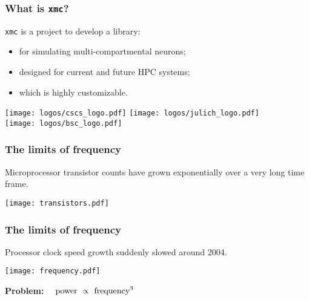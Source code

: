 \documentclass[aspectratio=43,12pt]{beamer}
\author{Sam Yates, CSCS}
\title{\xmc}
\subtitle{\xmc: modelling spiking multi-compartment networks at exascale}
\date{14 June 2017}
\newcommand{\xmc}{\texttt{xmc}\xspace}
\begin{document}
\cscstitle


\begin{frame}
\frametitle{What is \xmc?}
\vfill
\xmc{} is a project to develop a library:

\vfill
\begin{itemize}
\item for simulating multi-compartmental neurons;
\item designed for current and future HPC systems;
\item which is highly customizable.
\end{itemize}
\vfill

\centering 
\vspace{4ex}
\texttt{[image: logos/cscs\_logo.pdf]}
\hspace{15mm}
\texttt{[image: logos/julich\_logo.pdf]}
\hspace*{5mm}
\\[1.4em]
\texttt{[image: logos/bsc\_logo.pdf]}\\
\end{frame}



\begin{frame}
\frametitle{The limits of frequency}

\vfill
Microprocessor transistor counts have grown
exponentially over a very long time frame.

\vfill
\texttt{[image: transistors.pdf]}
\vfill
\end{frame}

\begin{frame}
\frametitle{The limits of frequency}

\vfill
Processor clock speed growth suddenly slowed around 2004.

\vfill
\texttt{[image: frequency.pdf]}

\vfill
\centering
\textbf{Problem:} $\quad\hbox{power}\ \propto\ \hbox{frequency}^3$

\vfill
\end{frame}
\end{document}
